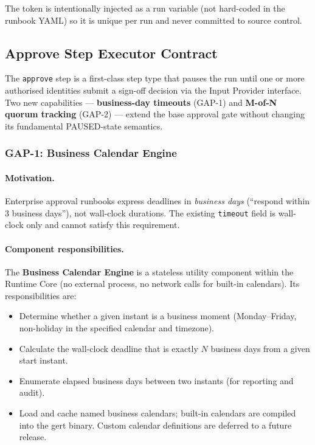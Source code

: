 The token is intentionally injected as a run variable (not hard-coded in the runbook YAML)
so it is unique per run and never committed to source control.

\subsection{Approve Step Executor Contract}
\label{sec:approve_executor_contract}

The \texttt{approve} step is a first-class step type that pauses the run until one or more
authorised identities submit a sign-off decision via the Input Provider interface. Two new
capabilities — \textbf{business-day timeouts} (GAP-1) and \textbf{M-of-N quorum tracking}
(GAP-2) — extend the base approval gate without changing its fundamental PAUSED-state
semantics.

\subsubsection*{GAP-1: Business Calendar Engine}
\label{sec:business_calendar}

\paragraph{Motivation.}
Enterprise approval runbooks express deadlines in \emph{business days} (``respond within
3 business days''), not wall-clock durations. The existing \texttt{timeout} field is
wall-clock only and cannot satisfy this requirement.

\paragraph{Component responsibilities.}
The \textbf{Business Calendar Engine} is a stateless utility component within the Runtime
Core (no external process, no network calls for built-in calendars). Its responsibilities
are:

\begin{itemize}
  \item Determine whether a given instant is a business moment (Monday–Friday,
        non-holiday in the specified calendar and timezone).
  \item Calculate the wall-clock deadline that is exactly $N$ business days from a
        given start instant.
  \item Enumerate elapsed business days between two instants (for reporting and audit).
  \item Load and cache named business calendars; built-in calendars are compiled into
        the gert binary. Custom calendar definitions are deferred to a future release.
\end{itemize}

